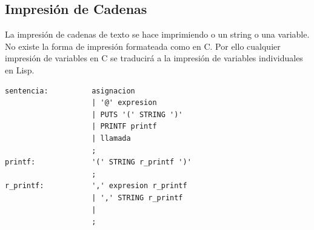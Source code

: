 \documentclass[12pt,a4paper]{article}
\begin{document}
\subsection{Impresión de Cadenas}
\noindent La impresión de cadenas de texto se hace imprimiendo o un string o una variable. No existe 
la forma de impresión formateada como en C. Por ello cualquier impresión de variables en C se 
traducirá a la impresión de variables individuales en Lisp.
\begin{lstlisting}
sentencia:          asignacion                                   
                    | '@' expresion                              
                    | PUTS '(' STRING ')'                       
                    | PRINTF printf                            
                    | llamada                                  
                    ;
printf:             '(' STRING r_printf ')'                    
                    ;
r_printf:           ',' expresion r_printf                    
                    | ',' STRING r_printf                      
                    |                                           
                    ;
\end{lstlisting}
\end{document}
